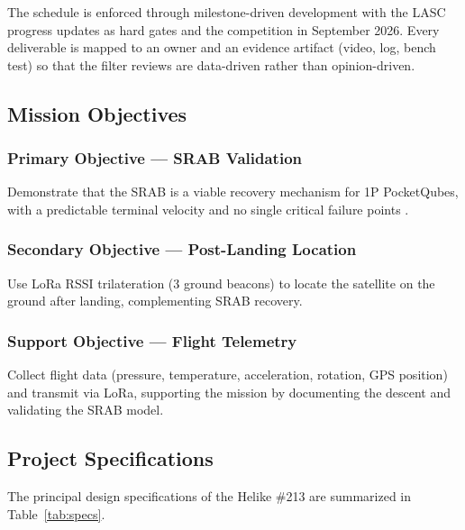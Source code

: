 The schedule is enforced through milestone-driven development with the
LASC progress updates as hard gates and the competition in
September 2026. Every deliverable is mapped to an owner and an
evidence artifact (video, log, bench test) so that the filter reviews
are data-driven rather than opinion-driven.

\subsection{Mission Objectives}

\subsubsection{Primary Objective — SRAB Validation}

Demonstrate that the SRAB is a viable recovery mechanism for 1P
PocketQubes, with a predictable terminal velocity and no single critical failure points
.

\subsubsection{Secondary Objective — Post-Landing Location}

Use LoRa RSSI trilateration (3 ground beacons) to locate the
satellite on the ground after landing, complementing SRAB recovery.

\subsubsection{Support Objective — Flight Telemetry}

Collect flight data (pressure, temperature, acceleration, rotation,
GPS position) and transmit via LoRa, supporting the mission by
documenting the descent and validating the SRAB model.

\subsection{Project Specifications}

The principal design specifications of the Helike \#213 are
summarized in Table~\ref{tab:specs}.

